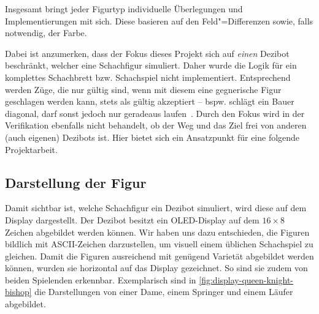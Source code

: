 
Insgesamt bringt jeder Figurtyp individuelle Überlegungen und Implementierungen mit sich. Diese basieren auf den Feld"=Differenzen sowie, falls notwendig, der Farbe.


Dabei ist anzumerken, dass der Fokus dieses Projekt sich auf \emph{einen} Dezibot beschränkt, welcher eine Schachfigur simuliert. Daher wurde die Logik für ein komplettes Schachbrett bzw. Schachspiel nicht implementiert. Entsprechend werden Züge, die nur gültig sind, wenn mit diesem eine gegnerische Figur geschlagen werden kann, stets als gültig akzeptiert -- bspw. schlägt ein Bauer diagonal, darf sonst jedoch nur geradeaus laufen~\cite{justUSChessFederations2019}. Durch den Fokus wird in der Verifikation ebenfalls nicht behandelt, ob der Weg und das Ziel frei von anderen (auch eigenen) Dezibots ist. Hier bietet sich ein Ansatzpunkt für eine folgende Projektarbeit.

\subsection{Darstellung der Figur}
\label{sec:display-representation}

Damit sichtbar ist, welche Schachfigur ein Dezibot simuliert, wird diese auf dem Display dargestellt. Der Dezibot besitzt ein OLED-Display auf dem $16 \times 8$ Zeichen abgebildet werden können. Wir haben uns dazu entschieden, die Figuren bildlich mit ASCII-Zeichen darzustellen, um visuell einem üblichen Schachspiel zu gleichen. Damit die Figuren ausreichend mit genügend Varietät abgebildet werden können, wurden sie horizontal auf das Display gezeichnet. So sind sie zudem von beiden Spielenden erkennbar. Exemplarisch sind in \autoref{fig:display-queen-knight-bishop} die Darstellungen von einer Dame, einem Springer und einem Läufer abgebildet.

